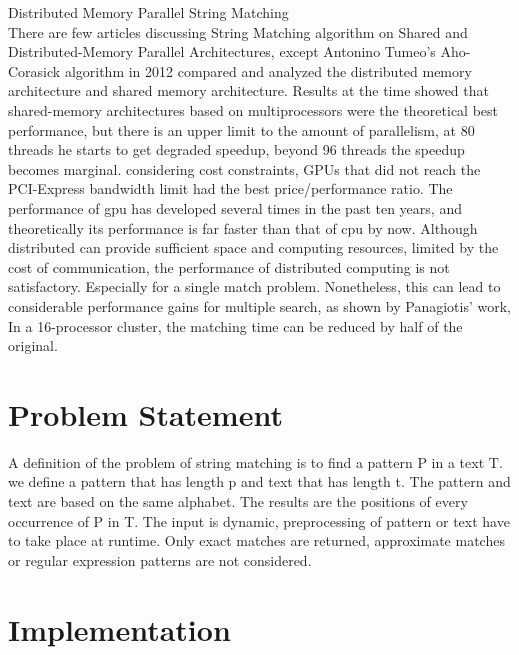 \documentclass[11pt]{article}       %
\begin{document}
Distributed Memory Parallel String Matching\\
There are few articles discussing String Matching algorithm on Shared and Distributed-Memory Parallel Architectures, except Antonino Tumeo's Aho-Corasick algorithm in 2012 compared and analyzed the distributed memory architecture and shared memory architecture\cite{Distributed-Memory}. Results at the time showed that shared-memory architectures based on multiprocessors were the theoretical best performance, but there is an upper limit to the amount of parallelism, at 80 threads he starts to get degraded speedup, beyond 96 threads the speedup becomes marginal. considering cost constraints, GPUs that did not reach the PCI-Express bandwidth limit had the best price/performance ratio. The performance of gpu has developed several times in the past ten years, and theoretically its performance is far faster than that of cpu by now. Although distributed can provide sufficient space and computing resources, limited by the cost of communication, the performance of distributed computing is not satisfactory. Especially for a single match problem. Nonetheless, this can lead to considerable performance gains for multiple search, as shown by Panagiotis' work\cite{MPI}, In a 16-processor cluster, the matching time can be reduced by half of the original.\\



\section{Problem Statement} \label{problemStatement}


A definition of the problem of string matching is to find a pattern P in a text T. we define a pattern that has length p and text that has length t. The pattern and text are based on the same alphabet. The results are the positions of every occurrence of P in T. The input is dynamic, preprocessing of pattern or text have to take place at runtime. Only exact matches are returned, approximate matches or regular expression patterns are not considered.

\section{Implementation} \label{proposedSolution}
\end{document}
